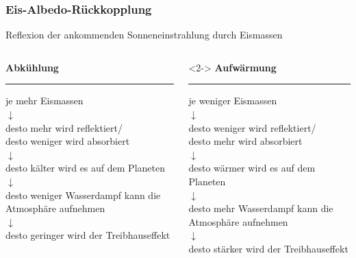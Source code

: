 \begin{frame}
	\frametitle{Eis-Albedo-Rückkopplung}%
	 Reflexion der ankommenden Sonneneinstrahlung durch Eismassen
	 
	 \begin{columns}[T] %
	 	\begin{column}{.48\textwidth}
	 		\centering
	 		\textbf{Abkühlung}\\
	 		\color{blue}\rule{\linewidth}{4pt}
	 		\color{black} 
	 		je mehr Eismassen\\
	 		$\downarrow$\\
	 		desto mehr wird reflektiert/\\
	 		desto weniger wird absorbiert\\
	 		$\downarrow$\\
	 		desto kälter wird es auf dem Planeten\\
	 		$\downarrow$\\
	 		desto weniger Wasserdampf kann die Atmosphäre aufnehmen\\
	 		$\downarrow$\\
	 		desto geringer wird der Treibhauseffekt
	 	\end{column}%
	 	\hfill%
	 	\begin{column}{.48\textwidth}<2->
	 		\centering
	 		\textbf{Aufwärmung}\\
	 		\color{red}\rule{\linewidth}{4pt}
	 		\color{black}
	 		je weniger Eismassen\\
	 		$\downarrow$\\
	 		desto weniger wird reflektiert/\\
	 		desto mehr wird absorbiert\\
	 		$\downarrow$\\
	 		desto wärmer wird es auf dem Planeten\\
	 		$\downarrow$\\
	 		desto mehr Wasserdampf kann die Atmosphäre aufnehmen\\
	 		$\downarrow$\\
	 		desto stärker wird der Treibhauseffekt
	 	\end{column}%
	 \end{columns}
	 

\end{frame}

